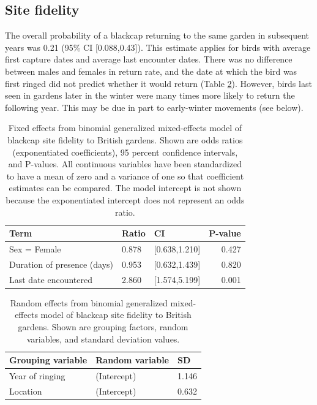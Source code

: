 \documentclass[a4paper, twoside]{templates/ociamthesis}
\begin{document}
\hypertarget{site-fidelity-1}{%
\subsection{Site fidelity}\label{site-fidelity-1}}

The overall probability of a blackcap returning to the same garden in subsequent years was 0.21 (95\% CI {[}0.088,0.43{]}). This estimate applies for birds with average first capture dates and average last encounter dates. There was no difference between males and females in return rate, and the date at which the bird was first ringed did not predict whether it would return (Table \ref{tab:fidelity-model-table}). However, birds last seen in gardens later in the winter were many times more likely to return the following year. This may be due in part to early-winter movements (see below).

\begin{table}[t]

\caption{\label{tab:fidelity-model-table}Fixed effects from binomial generalized mixed-effects model of blackcap site fidelity to British gardens. Shown are odds ratios (exponentiated coefficients), 95 percent confidence intervals, and P-values. All continuous variables have been standardized to have a mean of zero and a variance of one so that coefficient estimates can be compared. The model intercept is not shown because the exponentiated intercept does not represent an odds ratio.}
\centering
\begin{tabular}{l|l|l|r}
\hline
Term & Ratio & CI & P-value\\
\hline
Sex = Female & 0.878 & [0.638,1.210] & 0.427\\
\hline
Duration of presence (days) & 0.953 & [0.632,1.439] & 0.820\\
\hline
Last date encountered & 2.860 & [1.574,5.199] & 0.001\\
\hline
\end{tabular}
\end{table}

\begin{table}[t]

\caption{\label{tab:fidelity-model-table}Random effects from binomial generalized mixed-effects model of blackcap site fidelity to British gardens. Shown are grouping factors, random variables, and standard deviation values.}
\centering
\begin{tabular}{l|l|l}
\hline
Grouping variable & Random variable & SD\\
\hline
Year of ringing & (Intercept) & 1.146\\
\hline
Location & (Intercept) & 0.632\\
\hline
\end{tabular}
\end{table}
\end{document}

